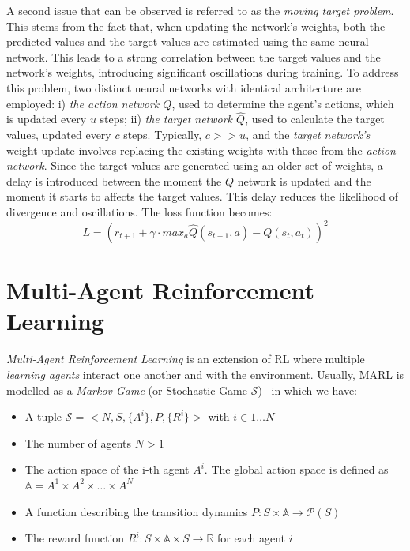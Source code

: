 \documentclass[12pt,a4paper,openright,twoside]{book}
\begin{document}
A second issue that can be observed is referred to as the \emph{moving target problem}. This stems from the fact that,
    when updating the network's weights, both the predicted values and the target values are estimated using the 
    same neural network. This leads to a strong correlation between the target values and the network's weights, 
    introducing significant oscillations during training. To address this problem, two distinct neural networks 
    with identical architecture are employed: 
    i) \emph{the action network $Q$}, used to determine the agent's actions, which is updated every $u$ steps; 
    ii) \emph{the target network $\hat{Q}$}, used to calculate the target values, updated every $c$ steps. 
    Typically, $c >> u$, and the \emph{target network's} weight update involves replacing the existing weights with 
    those from the \emph{action network}.
    Since the target values are generated using an older set of weights, a delay is introduced between the 
    moment the $Q$ network is updated and the moment it starts to affects the target values.
    This delay reduces the likelihood of divergence and oscillations. The loss function becomes:
    $$ L = ( r_{t+1} + \gamma \cdot max_a \hat{Q}(s_{t+1}, a) - Q(s_t, a_t))^2 $$

\section{Multi-Agent Reinforcement Learning}
\emph{Multi-Agent Reinforcement Learning} is an extension of RL where multiple \emph{learning agents} interact one another and 
    with the environment. 
    Usually, MARL is modelled as a \emph{Markov Game} (or Stochastic Game $\mathcal{S}$)~\cite{LITTMAN1994157} in
    which we have:
    \begin{itemize}
        \item A tuple $\mathcal{S} = <N, S, \{A^i\}, P, \{R^i\}>$ with $i \in 1 \dots N$
        \item The number of agents $N > 1$
        \item The action space of the i-th agent $A^i$. The global action space is defined as $\mathbb{A} = A^1 \times A^2 \times \dots \times A^N$
        \item A function describing the transition dynamics $P: S \times \mathbb{A} \rightarrow \mathcal{P}(S)$
        \item The reward function $R^i: S \times \mathbb{A} \times S \rightarrow \mathbb{R}$ for each agent $i$ 
    \end{itemize}
\end{document}
